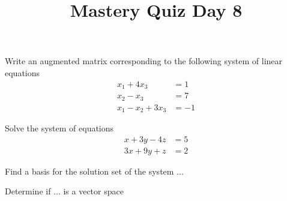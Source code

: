 \documentclass{sbgquiz}
\title{Mastery Quiz Day 8 }
\begin{document}
\begin{problem}[E1]
Write an augmented matrix corresponding to the following system of linear equations
\begin{align*}
x_1+4x_3 &= 1 \\
x_2-x_3 &= 7 \\
x_1-x_2+3x_3 &= -1
\end{align*}
\end{problem}

\begin{problem}[E3]
Solve the system of equations
\begin{align*}
x+3y-4z &= 5 \\
3x+9y+z &= 2
\end{align*}
\end{problem}

\begin{problem}[E4]
Find a basis for the solution set of the system ...
\end{problem}

\begin{problem}[V1]
Determine if ... is a vector space
\end{problem}
\end{document}
